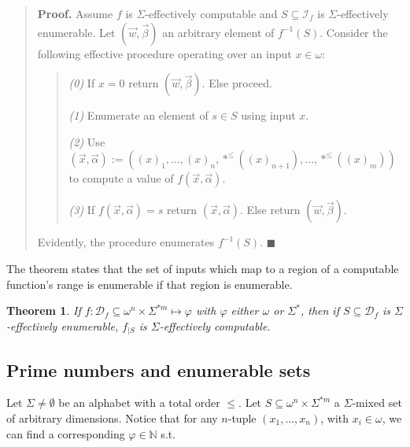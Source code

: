 \documentclass[a4paper, 12pt]{article}
\newtheorem{theorem}{Theorem}
\newtheorem{theorem}{Theorem}
\begin{document}
\small
\begin{quote}

\textbf{Proof.} Assume $f$ is $\Sigma$-effectively computable and $S \subseteq
\mathcal{I}_f$ is $\Sigma$-effectively enumerable. Let $(\vec{w}, \vec{\beta}) $
an arbitrary element of $f^{-1}(S)$. Consider the following
effective procedure operating over an input $x \in \omega$: 

\begin{quote}

    \textit{(0)} If $x = 0$ return $(\vec{w}, \vec{\beta})$. Else proceed.

    \textit{(1)} Enumerate an element of $s \in S$ using input $x$. 

    \textit{(2)} Use $(\vec{x}, \vec{\alpha}) := ( (x)_1, \ldots, (x)_n, *^{\leq}( (x)_{n+1}), \ldots,
    *^{\leq}( (x)_m ))$ to compute a value of $f(\vec{x}, \vec{\alpha})$. 

    \textit{(3)} If $f(\vec{x}, \vec{\alpha}) = s$ return $(\vec{x},
    \vec{\alpha}) $. Else return $(\vec{w}, \vec{\beta}) $.
\end{quote}

Evidently, the procedure enumerates $f^{-1}(S)$. $\blacksquare$

\end{quote}
\normalsize


The theorem states that the set of inputs which map to a region of a computable
function's range is enumerable if that region is enumerable.

\begin{theorem}
    If $f : \mathcal{D}_f \subseteq \omega^{n} \times \Sigma^{*m} \mapsto
    \varphi$ with $\varphi$ either $\omega$ or $\Sigma^{*}$, then if $S
    \subseteq \mathcal{D}_f$ is $\Sigma$-effectively enumerable, $f_{| S}$ is
    $\Sigma$-effectively computable.
\end{theorem}



\subsection{Prime numbers and enumerable sets}

Let $\Sigma \neq \emptyset$ be an alphabet with a total order $\leq$. Let $S
\subseteq \omega^{n} \times \Sigma^{*m}$ a $\Sigma$-mixed set of arbitrary
dimensions. Notice that for any $n$-tuple $(x_1, \ldots, x_n)$, with $x_i \in
\omega$, we can find a corresponding $\varphi \in \mathbb{N}$ s.t. 
\end{document}
